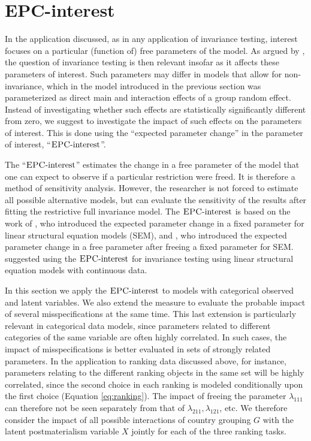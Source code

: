 \documentclass[letterpaper,12pt]{article}
\newcommand{\da}{\textrm{{\sc {EPC}}-interest}}
\begin{document}
\section{EPC-interest}

In the application discussed, as in any application of invariance testing, interest focuses on a particular (function of) free parameters of the model. As argued by \citet{Oberski:WP:EPC-interest}, the question of invariance testing is then relevant insofar as it affects these parameters of interest. Such parameters may differ in models that allow for non-invariance, which in the model introduced in the previous section was parameterized as direct main and interaction effects of a group random effect. Instead of investigating whether such effects are statistically significantly different from zero, we suggest to investigate the impact of such effects on the parameters of interest. This  is done using the ``expected parameter change'' in the parameter of interest, ``$\da$''.

The ``$\da$'' estimates the change in a free parameter of the model that one can expect to observe if a particular restriction were freed. It is therefore a method of sensitivity analysis. However, the researcher is not forced to estimate all possible alternative models, but can evaluate the sensitivity of the results after fitting the restrictive full invariance model. 
The $\da{}$ is based on the work of \citet{saris_detection_1987}, who introduced the expected parameter change in a fixed parameter for linear structural equation models (SEM), and \citet{bentler1993some}, who introduced the expected parameter change in a free parameter after freeing a fixed parameter for SEM. \citet{Oberski:WP:EPC-interest} suggested using the $\da{}$ for invariance testing using linear structural equation models with continuous data.

In this section we apply the $\da{}$ to models with categorical observed and latent variables. We also extend the measure to evaluate the probable impact of several misspecifications at the same time. This last extension is particularly relevant in categorical data models, since parameters related to different categories of the same variable are often highly correlated. In such cases, the impact of misspecifications is better evaluated in sets of strongly related parameters. In the application to ranking data discussed above, for instance, parameters relating to the different ranking objects in the same set will be highly correlated, since the second choice in each ranking is modeled conditionally upon the first choice (Equation \ref{eq:ranking}). The impact of freeing the parameter $\lambda_{111}$ can therefore not be seen separately from that of $\lambda_{211}, \lambda_{121}$, etc. We therefore consider the impact of all possible interactions of country grouping $G$ with the latent postmaterialism variable $X$ jointly for each of the three ranking tasks. 
\end{document}
